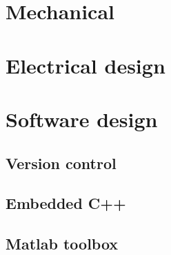 \documentclass[main.tex]{subfiles}
\begin{document}
\section{Mechanical}
\section{Electrical design}

\section{Software design}

	\subsection{Version control}

	\subsection{Embedded C++}

	\subsection{Matlab toolbox}
\end{document}
